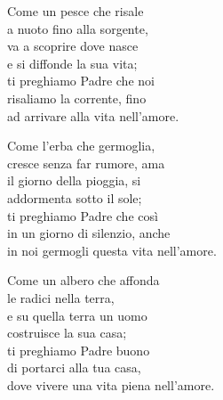 

\spazio

\strofa Come un pesce che risale\\
a nuoto fino alla sorgente,\\
va a scoprire dove nasce\\
e si diffonde la sua vita;\\
ti preghiamo Padre che noi\\
risaliamo la corrente, fino\\
ad arrivare alla vita nell'amore.

\spazio


\spazio

\strofa Come l'erba che germoglia,\\
cresce senza far rumore, ama\\
il giorno della pioggia, si\\
addormenta sotto il sole;\\
ti preghiamo Padre che così\\
in un giorno di silenzio, anche\\
in noi germogli questa vita nell'amore.

\spazio


\spazio

\strofa Come un albero che affonda\\
le radici nella terra,\\
e su quella terra un uomo\\
costruisce la sua casa;\\
ti preghiamo Padre buono\\
di portarci alla tua casa,\\
dove vivere una vita piena nell'amore.

\spazio

